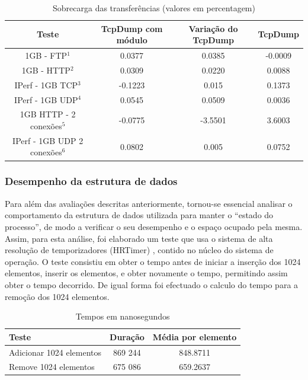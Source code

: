 \documentclass[a4paper]{llncs}
\begin{document}
\begin{table}
\begin{center}

\begin{tabular}{ | c | c | c | c | }
\hline
Teste & TcpDump com módulo & Variação do TcpDump & \hspace {0.3cm} TcpDump \hspace {0.3cm}\\

\hline
1GB - FTP$^{1}$  & 0.0377 & 0.0385 & -0.0009 \\
1GB - HTTP$^{2}$ &  0.0309 & 0.0220 & 0.0088 \\
IPerf - 1GB TCP$^{3}$ &  -0.1223 & 0.015 & 0.1373 \\
IPerf - 1GB UDP$^{4}$ & 0.0545 & 0.0509 & 0.0036 \\
\hline
\hline
1GB HTTP - 2 conexões$^{5}$ & -0.0775 & -3.5501 & 3.6003 \\
IPerf - 1GB UDP 2 conexões$^{6}$ & 0.0802 & 0.005 & 0.0752 \\
\hline
\end{tabular}
\caption{Sobrecarga das transferências (valores em percentagem)}
\label{tab:overhead}
\end{center}
\end{table}




\subsubsection{Desempenho da estrutura de dados}
Para além das avaliações descritas anteriormente, tornou-se essencial analisar o comportamento da estrutura de dados utilizada para manter o “estado do processo”, de modo a verificar o seu desempenho e o espaço ocupado pela mesma. Assim, para esta análise, foi elaborado um teste que usa o sistema de alta resolução de temporizadores (HRTimer) \cite{hrtimerKernel}, contido no núcleo do sistema de operação.
O teste consistiu em obter o tempo antes de iniciar a inserção dos 1024 elementos, inserir os elementos, e obter novamente o tempo, permitindo assim obter o tempo decorrido. De igual forma foi efectuado o calculo do tempo para a remoção dos 1024 elementos.

\begin{table}
\begin{center}

\begin{tabular}{ | l | c | c | }
\hline
\hspace{1.2cm} Teste \hspace{1cm} & \hspace{1cm}Duração\hspace{1cm} &  Média por
elemento \\
\hline
Adicionar 1024 elementos & 869 244 & 848.8711 \\
\hline
Remove 1024 elementos & 675 086 & 659.2637\\
\hline

\hline
\end{tabular}
\caption{Tempos em nanosegundos}
\label{tab:tree_info}
\end{center}
\end{table}
\end{document}
